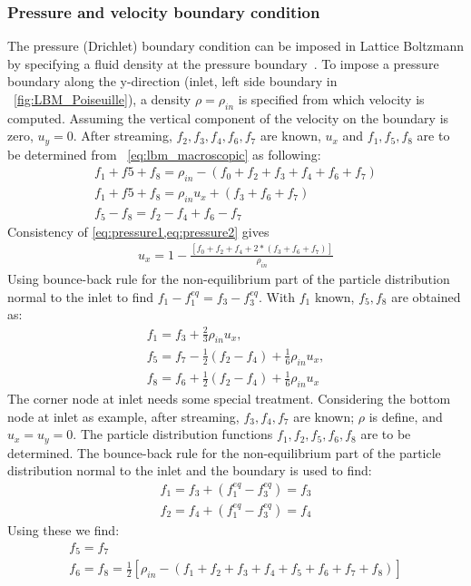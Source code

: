 \subsubsection*{Pressure and velocity boundary condition}
The pressure (Drichlet) boundary condition can be imposed in Lattice Boltzmann by specifying a fluid density at the pressure boundary~\citep{Zou1997}. To impose a pressure boundary along the y-direction (inlet, left side boundary in ~\cref{fig:LBM_Poiseuille}), a density $\rho = \rho_{in}$ is specified from which velocity is computed. Assuming the vertical component of the velocity on the boundary is zero, $u_y=0$. After streaming, $f_2, f_3, f_4, f_6, f_7$ are known, $u_x$ and $f_1, f_5, f_8$ are to be determined from ~\cref{eq:lbm_macroscopic} as following:
\begin{gather}
f_1+f5+f_8 = \rho_{in} - (f_0+f_2+f_3+f_4+f_6+f_7) \label{eq:pressure1}\\
f_1+f5+f_8 = \rho_{in}u_x + (f_3+f_6+f_7) \label{eq:pressure2} \\
f_5 - f_8  = f_2 - f_4 +f_6 -f_7
\end{gather}
\noindent Consistency of \cref{eq:pressure1,eq:pressure2} gives
\begin{align}
u_x = 1 - \frac{[f_0+f_2+f_4+2*(f_3+f_6+f_7)]}{\rho_{in}}
\end{align}
Using bounce-back rule for the non-equilibrium part of the particle distribution normal to the inlet to find $f_1 -f_1^{eq} = f_3 -f_3^{eq}$. With $f_1$ known, $f_5,f_8$ are obtained as:
\begin{gather}
f_1 = f_3 + \frac{2}{3} \rho_{in}u_x, \nonumber \\ 
f_5 = f_7 - \frac{1}{2}(f_2 - f_4) + \frac{1}{6}\rho_{in}u_x,\nonumber \\ 
f_8 = f_6 + \frac{1}{2}(f_2 - f_4) + \frac{1}{6}\rho_{in}u_x
\end{gather}
The corner node at inlet needs some special treatment. Considering the bottom node at inlet as example, after streaming, $f_3, f_4, f_7$ are known; $\rho$ is define, and $u_x = u_y = 0$. The particle distribution functions $f_1, f_2, f_5, f_6, f_8$ are to be determined. The bounce-back rule for the non-equilibrium part of the particle distribution normal to the inlet and the boundary is used to find:
\begin{gather}
f_1 = f_3 + (f_1^{eq}-f_3^{eq}) = f_3 \\
f_2 = f_4 + (f_1^{eq}-f_3^{eq}) = f_4
\end{gather}
\noindent Using these we find: 
\begin{gather}
f_5 = f_7 \\
f_6 = f_8 = \frac{1}{2}[\rho_{in} - (f_1 + f_2 + f_3 + f_4 + f_5 + f_6 + f_7 + f_8)]
\end{gather}

